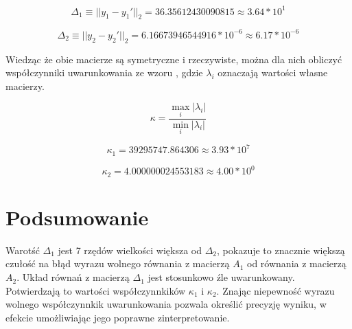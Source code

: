 \documentclass[11pt]{extarticle}
\begin{document}
	\begin{equation}
		\Delta_1 \equiv ||y_1 - y_1'||_2 = 36.35612430090815 \approx 3.64 * 10^{1}
	\end{equation}

	\begin{equation}
		\Delta_2 \equiv ||y_2 - y_2'||_2 = 6.16673946544916 * 10^{-6} \approx 6.17 * 10^{-6}
	\end{equation}

	Wiedząc że obie macierze są symetryczne i rzeczywiste,
	można dla nich obliczyć współczynniki uwarunkowania ze wzoru ,
	gdzie \( \lambda_i \) oznaczają wartości własne macierzy.

	\begin{equation}
		\label{eq.wsp_uw_kappa}
		\kappa = \frac{ \max_{i} |\lambda_i| }{  \min_{i} |\lambda_i|  }
	\end{equation}

	\begin{equation}
		\kappa_1 = 39295747.864306 \approx 3.93 * 10^7
	\end{equation}
	
	\begin{equation}
		\kappa_2 = 4.000000024553183 \approx 4.00 * 10^0
	\end{equation}


	\section{Podsumowanie}

	Warotść \( \Delta_1 \) jest 7 rzędów wielkości większa od \( \Delta_2 \),
	pokazuje to znacznie większą czułość na błąd wyrazu wolnego równania z macierzą \( A_1 \) od równania z macierzą \( A_2 \).
	Układ równań z macierzą \( \Delta_1 \) jest stosunkowo źle uwarunkowany.
	Potwierdzają to wartości współczynnkików \( \kappa_1 \) i \( \kappa_2 \).
	Znając niepewność wyrazu wolnego współczynnkik uwarunkowania pozwala określić precyzję wyniku,
	w efekcie umożliwiając jego poprawne zinterpretowanie.
\end{document}
